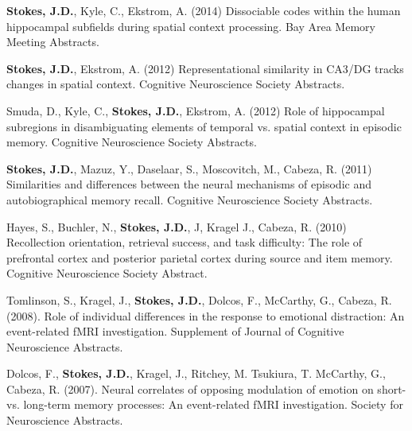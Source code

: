 \documentclass[line,margin,10pt]{res}
\begin{document}
\begin{resume}
\textbf{Stokes, J.D.}, Kyle, C., Ekstrom, A. (2014) Dissociable codes within the human hippocampal subfields during spatial context processing. Bay Area Memory Meeting Abstracts.

\textbf{Stokes, J.D.}, Ekstrom, A. (2012) Representational similarity in CA3/DG tracks changes in spatial context. Cognitive Neuroscience Society Abstracts.
 	
Smuda, D., Kyle, C., \textbf{Stokes, J.D.}, Ekstrom, A. (2012) Role of hippocampal subregions in disambiguating elements of temporal vs. spatial context in episodic memory. Cognitive Neuroscience Society Abstracts.
 	
\textbf{Stokes, J.D.}, Mazuz, Y., Daselaar, S., Moscovitch, M., Cabeza, R. (2011) Similarities and differences between the neural mechanisms of episodic and autobiographical memory recall. Cognitive Neuroscience Society Abstracts.
 	
Hayes, S., Buchler, N., \textbf{Stokes, J.D.}, J, Kragel J.,  Cabeza, R. (2010) Recollection orientation, retrieval success, and task difficulty: The role of prefrontal cortex and posterior parietal cortex during source and item memory. Cognitive Neuroscience Society Abstract.
 	
Tomlinson, S., Kragel, J., \textbf{Stokes, J.D.}, Dolcos, F., McCarthy, G., Cabeza, R. (2008). Role of individual differences in the response to emotional distraction: An event-related fMRI investigation. Supplement of Journal of Cognitive Neuroscience Abstracts.
 	
Dolcos, F., \textbf{Stokes, J.D.}, Kragel, J., Ritchey, M. Tsukiura, T. McCarthy, G., Cabeza, R. (2007). Neural correlates of opposing modulation of emotion on short- vs. long-term memory processes: An event-related fMRI investigation. Society for Neuroscience Abstracts.

\end{resume}
\end{document}
